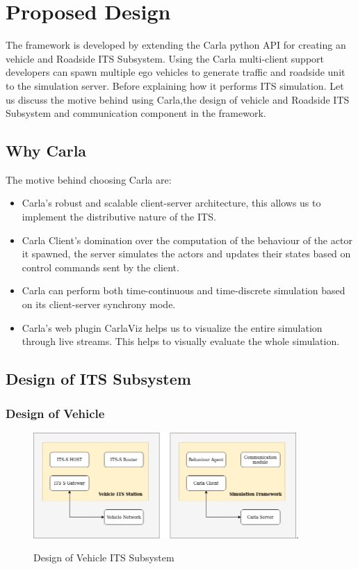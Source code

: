 \section{Proposed Design}
The framework is developed by extending the Carla python API for creating an vehicle and Roadside ITS Subsystem. Using the Carla multi-client support developers can spawn multiple ego vehicles to generate traffic and roadside unit to the simulation server. Before explaining how it performs ITS simulation. Let us discuss the motive behind using Carla,the design of vehicle and Roadside ITS Subsystem and communication component in the framework. 
\subsection{Why Carla}
The motive behind choosing Carla are:
\begin{itemize}
    \item Carla's robust and scalable client-server architecture, this allows us to implement the distributive nature of the ITS.
    \item Carla Client's domination over the computation of the behaviour of the actor it spawned, the server simulates the actors and updates their states based on control commands sent by the client. 
    \item Carla can perform both time-continuous and time-discrete simulation based on its client-server synchrony mode.
    \item Carla's web plugin CarlaViz helps us to visualize the entire simulation through live streams. This helps to visually evaluate the whole simulation.
\end{itemize}

\subsection{Design of ITS Subsystem}
\subsubsection{Design of Vehicle}

\begin{figure}[h!]
    \centering
    \includegraphics[width=10cm]{Framework/Images/vehicleF.png}.
    \caption{Design of Vehicle ITS Subsystem}
    \label{vehicleF}
\end{figure}

